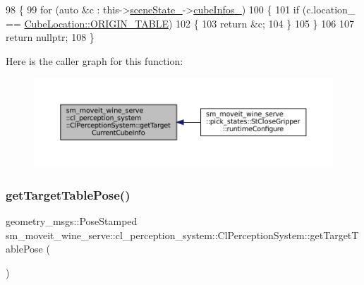 \begin{DoxyCode}
98             \{
99                 \textcolor{keywordflow}{for} (\textcolor{keyword}{auto} &c : this->\hyperlink{classsm__moveit__wine__serve_1_1cl__perception__system_1_1ClPerceptionSystem_addfd893a6f290ffc73d7f55cce9e637b}{sceneState\_}->\hyperlink{classsm__moveit__wine__serve_1_1cl__perception__system_1_1CpSceneState_a0b2d760a8ff2cb5e3735879d67ea3e67}{cubeInfos\_})
100                 \{
101                     \textcolor{keywordflow}{if} (c.location\_ == \hyperlink{namespacesm__moveit__wine__serve_1_1cl__perception__system_abb5953d380907809caaf4c1a83eec32cae5ee34c3ef8ec4a46a00a218416c7b1d}{CubeLocation::ORIGIN\_TABLE})
102                     \{
103                         \textcolor{keywordflow}{return} &c;
104                     \}
105                 \}
106 
107                 \textcolor{keywordflow}{return} \textcolor{keyword}{nullptr};
108             \}
\end{DoxyCode}
Here is the caller graph for this function\+:
\nopagebreak
\begin{figure}[H]
\begin{center}
\leavevmode
\includegraphics[width=350pt]{classsm__moveit__wine__serve_1_1cl__perception__system_1_1ClPerceptionSystem_a13bcd31217e9eda88d966d3ec142a465_icgraph}
\end{center}
\end{figure}
\mbox{\label{classsm__moveit__wine__serve_1_1cl__perception__system_1_1ClPerceptionSystem_af3691cf60b48afb75b347d38c0285c17}} 
\subsubsection{\texorpdfstring{get\+Target\+Table\+Pose()}{getTargetTablePose()}}
{\footnotesize\ttfamily geometry\+\_\+msgs\+::\+Pose\+Stamped sm\+\_\+moveit\+\_\+wine\+\_\+serve\+::cl\+\_\+perception\+\_\+system\+::\+Cl\+Perception\+System\+::get\+Target\+Table\+Pose (\begin{DoxyParamCaption}{ }\end{DoxyParamCaption})\hspace{0.3cm}{\ttfamily [inline]}}



